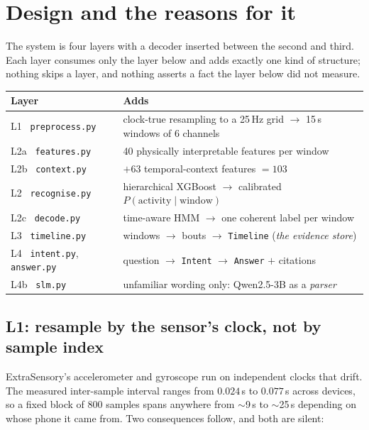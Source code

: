 \documentclass[11pt,a4paper]{article}
\newcommand{\code}[1]{\texttt{\small #1}}
\begin{document}
\section{Design and the reasons for it}

The system is four layers with a decoder inserted between the second and third. Each
layer consumes only the layer below and adds exactly one kind of structure; nothing
skips a layer, and nothing asserts a fact the layer below did not measure.

\begin{center}
\small
\begin{tabular}{@{}ll@{}}
\toprule
\textbf{Layer} & \textbf{Adds} \\
\midrule
L1 \ \code{preprocess.py} & clock-true resampling to a 25\,Hz grid $\rightarrow$ 15\,s windows of 6 channels \\
L2a \ \code{features.py}  & 40 physically interpretable features per window \\
L2b \ \code{context.py}   & $+63$ temporal-context features $=103$ \\
L2 \ \code{recognise.py}  & hierarchical XGBoost $\rightarrow$ calibrated $P(\text{activity} \mid \text{window})$ \\
L2c \ \code{decode.py}    & time-aware HMM $\rightarrow$ one coherent label per window \\
L3 \ \code{timeline.py}   & windows $\rightarrow$ bouts $\rightarrow$ \code{Timeline} (\emph{the evidence store}) \\
L4 \ \code{intent.py}, \code{answer.py} & question $\rightarrow$ \code{Intent} $\rightarrow$ \code{Answer} $+$ citations \\
L4b \ \code{slm.py} & unfamiliar wording only: Qwen2.5-3B as a \emph{parser} \\
\bottomrule
\end{tabular}
\end{center}

\subsection{L1: resample by the sensor's clock, not by sample index}

ExtraSensory's accelerometer and gyroscope run on independent clocks that drift. The
measured inter-sample interval ranges from $0.024$\,s to $0.077$\,s across devices, so a
fixed block of 800 samples spans anywhere from $\sim$9\,s to $\sim$25\,s depending on
whose phone it came from. Two consequences follow, and both are silent:
\end{document}
